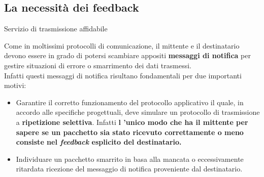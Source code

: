 \documentclass[10pt]{beamer}
\begin{document}
\subsection{La necessità dei feedback}
\begin{frame}{Servizio di trasmissione affidabile}{}

Come in moltissimi protocolli di comunicazione, il mittente e il destinatario devono essere in grado di potersi scambiare appositi \textbf{messaggi di notifica} per gestire situazioni di errore o smarrimento dei dati trasmessi. \\

\vspace*{10px}
Infatti questi messaggi di notifica risultano fondamentali per due importanti motivi:
\begin{itemize}
\item Garantire il corretto funzionamento del protocollo applicativo il quale, in accordo alle specifiche progettuali, deve simulare un protocollo di trasmissione a \textbf{ripetizione selettiva}. Infatti \textbf{l 'unico modo che ha il mittente per sapere se un pacchetto sia stato ricevuto correttamente o meno consiste nel \textit{feedback} esplicito del destinatario.} 
\item Individuare un pacchetto smarrito in basa alla mancata o eccessivamente ritardata ricezione del messaggio di notifica proveniente dal destinatario.
\end{itemize}

\end{frame}

\end{document}

